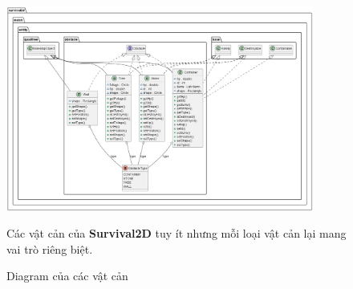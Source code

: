 \documentclass[12pt,a4paper]{article}
\begin{document}
  \begin{figure}
    \centering
    \includegraphics[width=0.9\textwidth]{Img/uml/obstacle.png}
    \caption{Diagram của các vật cản}
    Các vật cản của \textbf{Survival2D} tuy ít nhưng mỗi loại vật cản lại mang vai trò riêng biệt.
  \end{figure}
\end{document}
